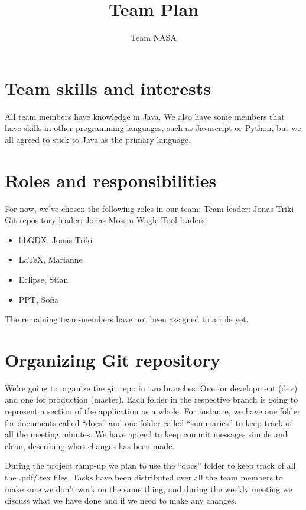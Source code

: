 \documentclass{article}
\title{Team Plan}
\author{Team NASA}
\date{}
\begin{document}
\maketitle

\section*{Team skills and interests}
All team members have knowledge in Java. We also have some members that have skills in other programming languages, such as Javascript or Python, but we all agreed to stick to Java as the primary language.

\section*{Roles and responsibilities}
For now, we've chosen the following roles in our team:
\newline Team leader: Jonas Triki
\newline Git repository leader: Jonas Mossin Wagle
\newline Tool leaders:
\begin{itemize}
    \item libGDX, Jonas Triki
    \item LaTeX, Marianne
    \item Eclipse, Stian
    \item PPT, Sofia
\end{itemize}
\newline The remaining team-members have not been assigned to a role yet.

\section*{Organizing Git repository}

We’re going to organize the git repo in two branches: One for development (dev) and one for production (master). Each folder in the respective branch is going to represent a section of the application as a whole. For instance, we have one folder for documents called “docs” and one folder called “summaries” to keep track of all the meeting minutes. We have agreed to keep commit messages simple and clean, describing what changes has been made.

During the project ramp-up we plan to use the “docs” folder to keep track of all the .pdf/.tex files. Tasks have been distributed over all the team members to make sure we don’t work on the same thing, and during the weekly meeting we discuss what we have done and if we need to make any changes.
\end{document}
